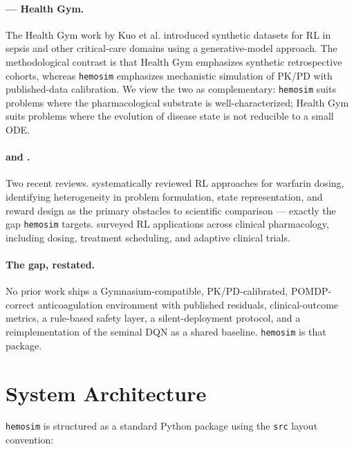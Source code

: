 \documentclass[11pt]{article}
\begin{document}
\paragraph{\citet{kuo2022} --- Health Gym.}
The Health Gym work by Kuo et al. introduced synthetic datasets for RL in sepsis and other critical-care domains using a generative-model approach. The methodological contrast is that Health Gym emphasizes synthetic retrospective cohorts, whereas \texttt{hemosim} emphasizes mechanistic simulation of PK/PD with published-data calibration. We view the two as complementary: \texttt{hemosim} suits problems where the pharmacological substrate is well-characterized; Health Gym suits problems where the evolution of disease state is not reducible to a small ODE.

\paragraph{\citet{anzabizadeh2023} and \citet{tosca2024}.}
Two recent reviews. \citet{anzabizadeh2023} systematically reviewed RL approaches for warfarin dosing, identifying heterogeneity in problem formulation, state representation, and reward design as the primary obstacles to scientific comparison --- exactly the gap \texttt{hemosim} targets. \citet{tosca2024} surveyed RL applications across clinical pharmacology, including dosing, treatment scheduling, and adaptive clinical trials.

\paragraph{The gap, restated.}
No prior work ships a Gymnasium-compatible, PK/PD-calibrated, POMDP-correct anticoagulation environment with published residuals, clinical-outcome metrics, a rule-based safety layer, a silent-deployment protocol, and a reimplementation of the seminal \citet{nemati2016} DQN as a shared baseline. \texttt{hemosim} is that package.

\section{System Architecture}
\label{sec:architecture}

\texttt{hemosim} is structured as a standard Python package using the \texttt{src} layout convention:
\end{document}
